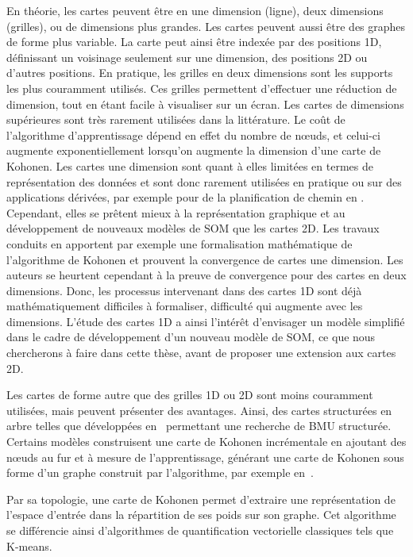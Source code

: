 \documentclass[../main]{subfiles}
\begin{document}
En théorie, les cartes peuvent être en une dimension (ligne), deux dimensions (grilles), ou de dimensions plus grandes. Les cartes peuvent aussi être des graphes de forme plus variable. La carte peut ainsi être indexée par des positions 1D, définissant un voisinage seulement sur une dimension, des positions 2D ou d'autres positions.
En pratique, les grilles en deux dimensions sont les supports les plus couramment utilisés. Ces grilles permettent d'effectuer une réduction de dimension, tout en étant facile à visualiser sur un écran. Les cartes de dimensions supérieures sont très rarement utilisées dans la littérature. Le coût de l'algorithme d'apprentissage dépend en effet du nombre de n\oe{}uds, et celui-ci augmente exponentiellement lorsqu'on augmente la dimension d'une carte de Kohonen.
Les cartes une dimension sont quant à elles limitées en termes de représentation des données et sont donc rarement utilisées en pratique ou sur des applications dérivées, par exemple pour de la planification de chemin en \cite{FrezzaBuet2020SelforganizingMI}.
Cependant, elles se prêtent mieux à la représentation graphique et au développement de nouveaux modèles de SOM que les cartes 2D.
Les travaux conduits en \cite{cottrell_theoretical_2016,fort_soms_2006} apportent par exemple une formalisation mathématique de l'algorithme de Kohonen et prouvent la convergence de cartes une dimension. Les auteurs se heurtent cependant à la preuve de convergence pour des cartes en deux dimensions. Donc, les processus intervenant dans des cartes 1D sont déjà mathématiquement difficiles à formaliser, difficulté qui augmente avec les dimensions.
L'étude des cartes 1D a ainsi l'intérêt d'envisager un modèle simplifié dans le cadre de développement d'un nouveau modèle de SOM, ce que nous chercherons à faire dans cette thèse, avant de proposer une extension aux cartes 2D.

Les cartes de forme autre que des grilles 1D ou 2D sont moins couramment utilisées, mais peuvent présenter des avantages. Ainsi, des cartes structurées en arbre telles que développées en~\cite{koikkalainen_self-organizing_1990} permettant une recherche de BMU structurée. Certains modèles construisent une carte de Kohonen incrémentale en ajoutant des n\oe{}uds au fur et à mesure de l'apprentissage, générant une carte de Kohonen sous forme d'un graphe construit par l'algorithme, par exemple en~\cite{alahakoon_dynamic_2000, yamaguchi_adaptive_2010}.

Par sa topologie, une carte de Kohonen permet d'extraire une représentation de l'espace d'entrée dans la répartition de ses poids sur son graphe. Cet algorithme se différencie ainsi d'algorithmes de quantification vectorielle classiques tels que K-means.
\end{document}
